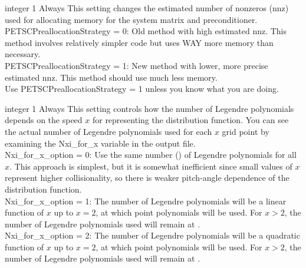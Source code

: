 \myhrule

{integer}
{1}
{Always}
{This setting changes the estimated number of nonzeros (nnz) used for allocating memory for the system matrix and preconditioner.\\

{\ttfamily PETSCPreallocationStrategy} = 0: Old method with high estimated nnz. This method involves relatively simpler code but uses WAY more memory than necessary.\\

{\ttfamily PETSCPreallocationStrategy} = 1: New method with lower, more precise estimated nnz.  This method should use much less memory.\\

Use {\ttfamily PETSCPreallocationStrategy} = 1 unless you know what you are doing.}


\myhrule

{integer}
{1}
{Always}
{This setting controls how the number of Legendre polynomials depends on the speed $x$ for representing the distribution function.
You can see the actual number of Legendre polynomials used for each $x$ grid point by examining the {\ttfamily Nxi\_for\_x} variable
in the output file.\\

{\ttfamily Nxi\_for\_x\_option} = 0: Use the same number () of Legendre polynomials for all $x$.  This approach is
simplest, but it is somewhat inefficient since small values of $x$ represent higher collisionality, so there is weaker pitch-angle dependence
of the distribution function.\\

{\ttfamily Nxi\_for\_x\_option} = 1: The number of Legendre polynomials will be a linear function of $x$ up to $x=2$,
at which point  polynomials will be used. For $x>2$, the number of Legendre polynomials used will remain at .\\

{\ttfamily Nxi\_for\_x\_option} = 2: The number of Legendre polynomials will be a quadratic function of $x$ up to $x=2$,
at which point  polynomials will be used. For $x>2$, the number of Legendre polynomials used will remain at .\\

}









